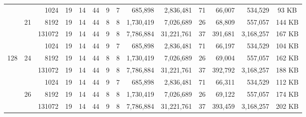 \begin{table}
\begin{tabular}{ccr|cc|cccrr|crr|c}
          &       &   1024  &        19 &    14 &        44 &     9 &       7 &        685,898 &  2,836,481 &    71 &       66,007 &    534,529 & 93 KB  \\
          &    21 &   8192  &        19 &    14 &        44 &     8 &       8 &      1,730,419 &  7,026,689 &    26 &       68,809 &    557,057 & 144 KB \\
          &       & 131072  &        19 &    14 &        44 &     9 &       8 &      7,786,884 & 31,221,761 &    37 &      391,681 &  3,168,257 & 167 KB \\\cline{2-14}

          &       &   1024  &        19 &    14 &        44 &     9 &       7 &        685,898 &  2,836,481 &    71 &       66,197 &    534,529 & 104 KB \\
      128 &    24 &   8192  &        19 &    14 &        44 &     8 &       8 &      1,730,419 &  7,026,689 &    26 &       69,004 &    557,057 & 162 KB \\
          &       & 131072  &        19 &    14 &        44 &     9 &       8 &      7,786,884 & 31,221,761 &    37 &      392,792 &  3,168,257 & 188 KB \\\cline{2-14}

          &       &   1024  &        19 &    14 &        44 &     9 &       7 &        685,898 &  2,836,481 &    71 &       66,311 &    534,529 & 112 KB \\
          &    26 &   8192  &        19 &    14 &        44 &     8 &       8 &      1,730,419 &  7,026,689 &    26 &       69,122 &    557,057 & 174 KB \\
          &       & 131072  &        19 &    14 &        44 &     9 &       8 &      7,786,884 & 31,221,761 &    37 &      393,459 &  3,168,257 & 202 KB \\\bottomrule

  
  

\end{tabular}
\end{table}
